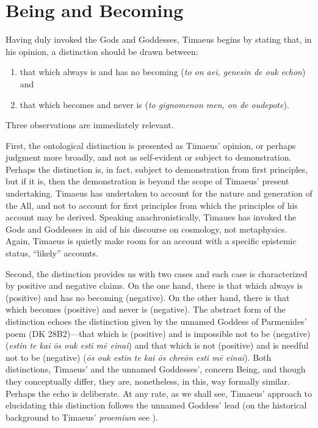 
\section{Being and Becoming} %
\label{sec:Being and Becoming}

Having duly invoked the Gods and Goddesses, Timaeus begins by stating that, in his opinion, a distinction should be drawn between: 
\begin{enumerate}[(1)]
	\item that which always is and has no becoming (\emph{to on aei, genesin de ouk echon}) and
	\item that which becomes and never is (\emph{to gignomenon men, on de oudepote}).
\end{enumerate}
Three observations are immediately relevant. 

First, the ontological distinction is presented as Timaeus' opinion, or perhaps judgment more broadly, and not as self-evident or subject to demonstration. Perhaps the distinction is, in fact, subject to demonstration from first principles, but if it is, then the demonstration is beyond the scope of Timaeus' present undertaking. Timaeus has undertaken to account for the nature and generation of the All, and not to account for first principles from which the principles of his account may be derived. Speaking anachronistically, Timaues has invoked the Gods and Goddesses in aid of his discourse on cosmology, not metaphysics. Again, Timaeus is quietly make room for an account with a specific epistemic status, ``likely'' accounts.

Second, the distinction provides us with two cases and each case is characterized by positive and negative claims. On the one hand, there is that which always is (positive) and has no becoming (negative). On the other hand, there is that which becomes (positive) and never is (negative). The abstract form of the distinction echoes the distinction given by the unnamed Goddess of Parmenides' poem (DK 28B2)---that which is (positive) and is impossible not to be (negative) (\emph{estin te kai ōs ouk esti mē einai}) and that which is not (positive) and is needful not to be (negative) (\emph{ōs ouk estin te kai ōs chreōn esti mē einai}). Both distinctions, Timaeus' and the unnamed Goddesses', concern Being, and though they conceptually differ, they are, nonetheless, in this, way formally similar. Perhaps the echo is deliberate. At any rate, as we shall see, Timaeus' approach to elucidating this distinction follows the unnamed Goddess' lead (on the historical background to Timaeus' \emph{proemium} see \citealt{Runia:1997vz}).

